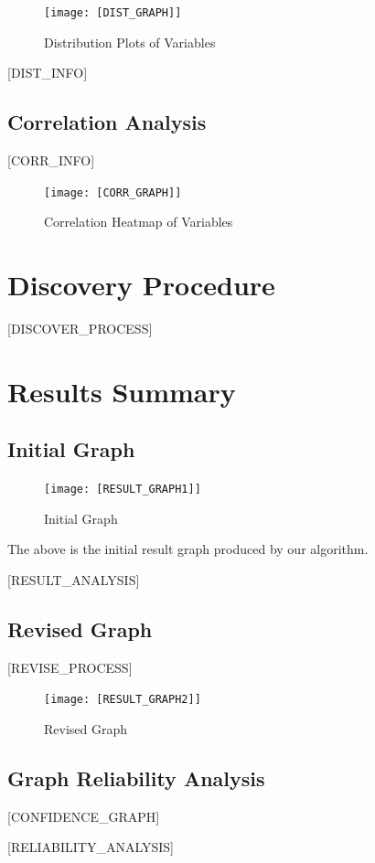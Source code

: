 \documentclass{article}
\begin{document}
\begin{figure}[H]
\centering
\texttt{[image: [DIST\_GRAPH]]}
\caption{\label{fig:dist}Distribution Plots of Variables}
\end{figure}

[DIST_INFO]

\subsection{Correlation Analysis}

\begin{minipage}[t]{0.5\linewidth}
    [CORR_INFO]
\vfill
\end{minipage}
\hfill
\begin{minipage}[t]{0.5\linewidth}
    \begin{figure}[H]
        \centering
        \vspace{-1.5cm}
        \texttt{[image: [CORR\_GRAPH]]}
        \caption{\label{fig:corr}Correlation Heatmap of Variables}
    \end{figure}
\end{minipage}

\section{Discovery Procedure}
[DISCOVER_PROCESS]

\section{Results Summary}

\subsection{Initial Graph}

\begin{figure}[H]
    \centering
    \texttt{[image: [RESULT\_GRAPH1]]}
    \caption{Initial Graph}
\end{figure}

The above is the initial result graph produced by our algorithm.

[RESULT_ANALYSIS]

\subsection{Revised Graph}

\begin{minipage}[t]{0.6\linewidth}
    [REVISE_PROCESS]
\vfill
\end{minipage}
\hfill
\begin{minipage}[t]{0.4\linewidth}
    \begin{figure}[H]
        \centering
        \vspace{-0.5cm}
        \texttt{[image: [RESULT\_GRAPH2]]}
        \caption{\label{fig:corr}Revised Graph}
    \end{figure}
\end{minipage}


\subsection{Graph Reliability Analysis}

[CONFIDENCE_GRAPH]

[RELIABILITY_ANALYSIS]

\end{document}
